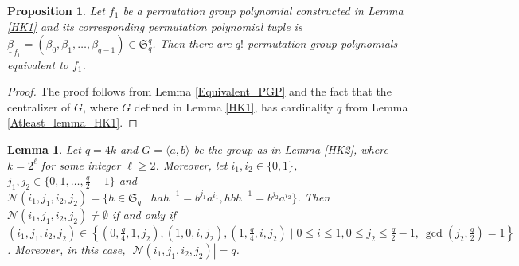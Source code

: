 \documentclass[11pt]{amsart}
\theoremstyle{plain}
\newtheorem{lem}[thm]{Lemma}
\newtheorem{prop}[thm]{Proposition}
\numberwithin{equation}{section}
\begin{document}
\begin{prop}\label{Cor_HK1}
Let $f_1$ be a permutation group polynomial constructed in Lemma \ref{HK1} and its corresponding permutation polynomial tuple is $\underline{\beta}_{f_1}=(\beta_0,\beta_1,\ldots,\beta_{q-1})\in \mathfrak{S}_q^{q}$. Then there are $q!$ permutation group polynomials equivalent to $f_1$.
\end{prop}
\begin{proof}
The proof follows from Lemma \ref{Equivalent_PGP} and the fact that the centralizer of $G$, where $G$ defined in Lemma \ref{HK1}, has cardinality $q$ from Lemma \ref{Atleast_lemma_HK1}.
  \end{proof} 
\begin{lem}\label{Lemma_HK2} 
Let $q=4k$ and $G =\langle a,b \rangle$ be the group as in Lemma \ref{HK2}, where $k=2^{\ell}$ for some integer $\ell \geq 2$. Moreover, let $i_1,i_2 \in \{0,1\}$, $j_1, j_2 \in \{0,1,\ldots, \frac{q}{2}-1\}$ and $\mathcal{N}(i_1,j_1,i_2,j_2)=\{h \in \mathfrak{S}_q \mid hah^{-1}=b^{j_1}a^{i_1}, hbh^{-1}=b^{j_2}a^{i_2}\}$. Then  $\mathcal{N}(i_1,j_1,i_2,j_2) \neq \emptyset$ if and only if $(i_1,j_1,i_2,j_2) \in \left\{(0,\frac{q}{4},1,j_2), (1,0,i,j_2), (1,\frac{q}{4},i,j_2) \mid  0 \leq i \leq 1, 0 \leq j_2 \leq \frac{q}{2}-1, ~\gcd(j_2,\frac{q}{2})=1\right\}$. Moreover, in this case, $|\mathcal{N}(i_1,j_1,i_2,j_2)|=q$.
\end{lem}
\end{document}
